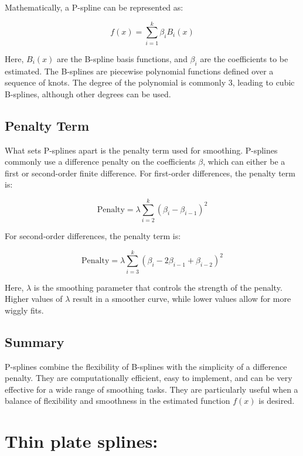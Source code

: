 \documentclass{article}
\begin{document}
Mathematically, a P-spline can be represented as:

\begin{equation}
f(x) = \sum_{i=1}^{k} \beta_i B_i(x)
\end{equation}

Here, \(B_i(x)\) are the B-spline basis functions, and \(\beta_i\) are the coefficients to be estimated. The B-splines are piecewise polynomial functions defined over a sequence of knots. The degree of the polynomial is commonly 3, leading to cubic B-splines, although other degrees can be used.

\subsection{Penalty Term}

What sets P-splines apart is the penalty term used for smoothing. P-splines commonly use a difference penalty on the coefficients \(\beta\), which can either be a first or second-order finite difference. For first-order differences, the penalty term is:

\begin{equation}
\text{Penalty} = \lambda \sum_{i=2}^{k} (\beta_i - \beta_{i-1})^2
\end{equation}

For second-order differences, the penalty term is:

\begin{equation}
\text{Penalty} = \lambda \sum_{i=3}^{k} (\beta_i - 2\beta_{i-1} + \beta_{i-2})^2
\end{equation}

Here, \(\lambda\) is the smoothing parameter that controls the strength of the penalty. Higher values of \(\lambda\) result in a smoother curve, while lower values allow for more wiggly fits.



\subsection{Summary}

P-splines combine the flexibility of B-splines with the simplicity of a difference penalty. They are computationally efficient, easy to implement, and can be very effective for a wide range of smoothing tasks. They are particularly useful when a balance of flexibility and smoothness in the estimated function \(f(x)\) is desired.


\section{Thin plate splines:}
\end{document}
